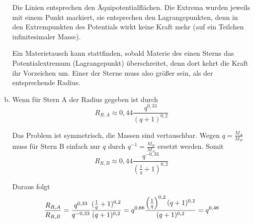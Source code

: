 \documentclass[a4paper,german,12pt,smallheadings]{scrartcl}
\begin{document}
\begin{enumerate}[a)]
    Die Linien entsprechen den Äquipotentialflächen. Die Extrema wurden jeweils mit
    einem Punkt markiert, sie entsprechen den Lagrangepunkten, denn in den
    Extrempunkten des Potentials wirkt keine Kraft mehr (auf ein Teilchen
    infinitesimaler Masse).

    Ein Materietausch kann stattfinden, sobald Materie des einen Sterns das
    Potentialextremum (Lagrangepunkt) überschreitet, denn dort kehrt die Kraft
    ihr Vorzeichen um. Einer der Sterne muss also größer sein, als der
    entsprechende Radius.
  \item
    Wenn für Stern A der Radius gegeben ist durch
    \begin{equation}
      R_{R,A} \approx 0{,}44 \frac{q^{0{,}33}}{(q+1)^{0{,}2}}
    \end{equation}

    Das Problem ist symmetrisch, die Massen sind vertauschbar. Wegen $q =
    \frac{M_A}{M_B}$ muss für Stern B einfach nur $q$ durch $q^{-1} =
    \frac{M_B}{M_A}$ ersetzt werden. Somit
    \begin{equation}
      R_{R,B} \approx 0{,}44 \frac{q^{-0{,}33}}{(\frac{1}{q}+1)^{0{,}2}}
    \end{equation}

    Daraus folgt
    \begin{align*}
      \frac{R_{R,A}}{R_{R,B}} = \frac{q^{0,33}}{q^{-0{,}33}} \frac{(\frac{1}{q}+1)^{0{,}2}}{(q+1)^{0{,}2}} = q^{0{,}66} \frac{\del{\frac{1}{q}}^{0{,}2} (q+1)^{0{,}2}}{(q+1)^{0{,}2}} = q^{0{,}46}
    \end{align*}


\end{enumerate}
\end{document}
